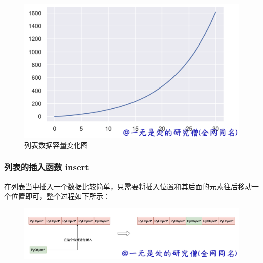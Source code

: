    \begin{figure}[H]
        \centering
            \includegraphics[scale=.2]{images/03-list.png}
            \caption{列表数据容量变化图}
        \label{fig:my_label}
    \end{figure}
    
\subsubsection{列表的插入函数 insert}
在列表当中插入一个数据比较简单，只需要将插入位置和其后面的元素往后移动一个位置即可，整个过程如下所示：

    \begin{figure}[H]
        \centering
            \includegraphics[scale=.3]{images/04-list.png}
            \caption{ }
        \label{fig:my_label}
    \end{figure}
    
